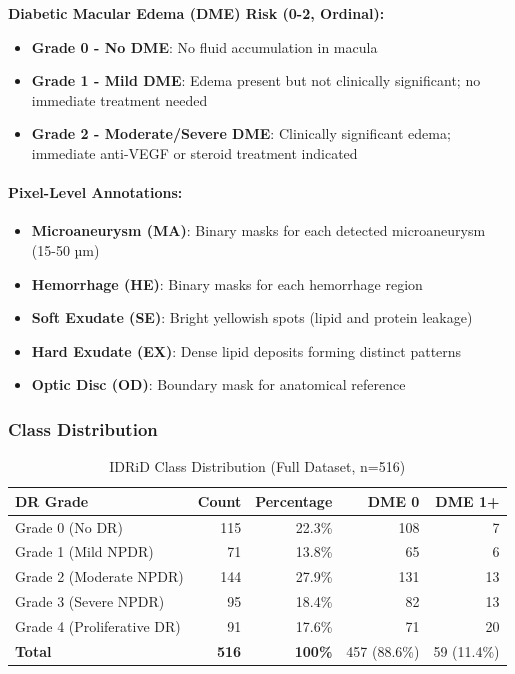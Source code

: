 \documentclass[12pt,a4paper]{article}
\begin{document}
\textbf{Diabetic Macular Edema (DME) Risk (0-2, Ordinal):}
\begin{itemize}
    \item \textbf{Grade 0 - No DME}: No fluid accumulation in macula
    \item \textbf{Grade 1 - Mild DME}: Edema present but not clinically significant; no immediate treatment needed
    \item \textbf{Grade 2 - Moderate/Severe DME}: Clinically significant edema; immediate anti-VEGF or steroid treatment indicated
\end{itemize}

\paragraph{Pixel-Level Annotations:}
\begin{itemize}
    \item \textbf{Microaneurysm (MA)}: Binary masks for each detected microaneurysm (15-50 µm)
    \item \textbf{Hemorrhage (HE)}: Binary masks for each hemorrhage region
    \item \textbf{Soft Exudate (SE)}: Bright yellowish spots (lipid and protein leakage)
    \item \textbf{Hard Exudate (EX)}: Dense lipid deposits forming distinct patterns
    \item \textbf{Optic Disc (OD)}: Boundary mask for anatomical reference
\end{itemize}

\subsubsection{Class Distribution}

\begin{table}[H]
\centering
\small
\caption{IDRiD Class Distribution (Full Dataset, n=516)}
\begin{tabular}{|l|r|r|r|r|}
\hline
\textbf{DR Grade} & \textbf{Count} & \textbf{Percentage} & \textbf{DME 0} & \textbf{DME 1+} \\
\hline
Grade 0 (No DR) & 115 & 22.3\% & 108 & 7 \\
Grade 1 (Mild NPDR) & 71 & 13.8\% & 65 & 6 \\
Grade 2 (Moderate NPDR) & 144 & 27.9\% & 131 & 13 \\
Grade 3 (Severe NPDR) & 95 & 18.4\% & 82 & 13 \\
Grade 4 (Proliferative DR) & 91 & 17.6\% & 71 & 20 \\
\hline
\textbf{Total} & \textbf{516} & \textbf{100\%} & 457 (88.6\%) & 59 (11.4\%) \\
\hline
\end{tabular}
\end{table}
\end{document}
